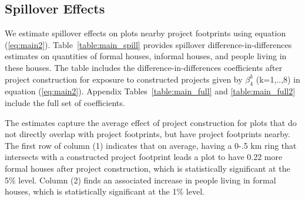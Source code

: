 \documentclass[12pt]{article}
\newcommand{\rv}{}
\begin{document}
\subsection{Spillover Effects}\label{section:spillovereffects}

\rv{We estimate spillover effects on plots nearby project footprints using equation (\ref{eq:main2}).  Table~\ref{table:main_spill} provides spillover difference-in-differences estimates on quantities of formal houses, informal houses, and people living in these houses.  The table includes the difference-in-differences coefficients after project construction for exposure to constructed projects given by $\beta_4^{k}$ (k=1,..,8) in equation (\ref{eq:main2}).  Appendix Tables~\ref{table:main_full} and \ref{table:main_full2} include the full set of coefficients.   }

\begin{table}[h!]
\small
\centering
\caption{Spillover Effects on Population and Informal Housing}\label{table:main_spill}
\vspace{-2mm}
\end{table}

\rv{The estimates capture the average effect of project construction for plots that do not directly overlap with project footprints, but have project footprints nearby.   The first row of column (1) indicates that on average, having a 0-.5 km ring that intersects with a constructed project footprint leads a plot to have 0.22 more formal houses after project construction, which is statistically significant at the 5\% level.  Column (2) finds an associated increase in people living in formal houses, which is statistically significant at the 1\% level.  }
\end{document}
